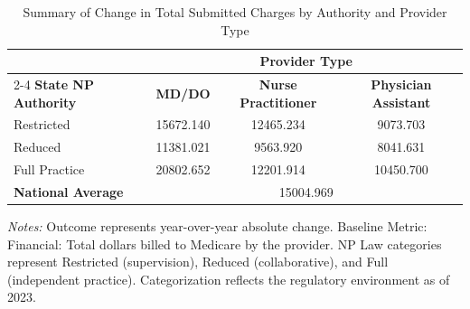 \begin{table}[htbp]
    \centering
    \caption{Summary of Change in Total Submitted Charges by Authority and Provider Type}
    \label{tab:d_tot_sbmtd_chrg_provtype}
    \vspace{0.2cm}
    \begin{tabular}{lccc}
        \toprule
        & \multicolumn{3}{c}{\textbf{Provider Type}} \\
        \cmidrule(lr){2-4}
        \textbf{State NP Authority} & \textbf{MD/DO} & \textbf{Nurse Practitioner} & \textbf{Physician Assistant} \\
        \midrule
        Restricted & 15672.140 & 12465.234 & 9073.703 \\
        Reduced & 11381.021 & 9563.920 & 8041.631 \\
        Full Practice & 20802.652 & 12201.914 & 10450.700 \\
        \midrule
        \textbf{National Average} & \multicolumn{3}{c}{15004.969} \\
        \bottomrule
    \end{tabular}
    \vspace{0.1cm}
    \begin{minipage}{0.85\textwidth}
        \footnotesize \textit{Notes:} Outcome represents year-over-year absolute change. Baseline Metric: Financial: Total dollars billed to Medicare by the provider. NP Law categories represent Restricted (supervision), Reduced (collaborative), and Full (independent practice). Categorization reflects the regulatory environment as of 2023.
    \end{minipage}
\end{table}